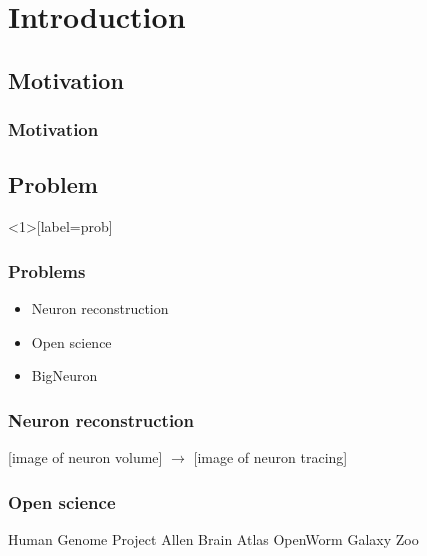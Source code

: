 \documentclass[%
        hyperref={%
                pdfauthor={Zakariyya Mughal},%
                pdfpagemode={None},pdfpagelayout={SinglePage}},%
        xcolor={x11names}%
]{beamer}
\begin{document}

\frame{\titlepage}


\section{Introduction}
\subsection{Motivation}
\begin{frame}
\frametitle{Motivation}
\end{frame}

\subsection{Problem}
\begin{frame}<1>[label=prob]\frametitle{Problems}
\begin{itemize}
	\item<1-> Neuron reconstruction
	\item<3-> Open science
	\item<2-> BigNeuron
\end{itemize}
\end{frame}

\begin{frame}\frametitle{Neuron reconstruction}
	[image of neuron volume]
	$\rightarrow$
	[image of neuron tracing]
\end{frame}


\begin{frame}\frametitle{Open science}
	Human Genome Project
	Allen Brain Atlas
	OpenWorm
	Galaxy Zoo
\end{frame}
\end{document}
